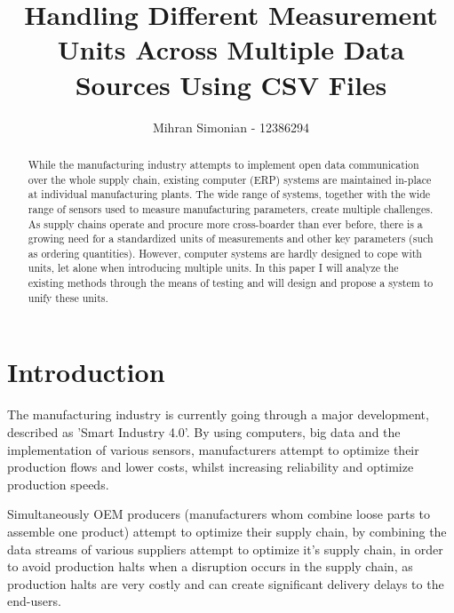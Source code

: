 \documentclass[sigchi, nonacm]{acmart}
\begin{document}
\title{Handling Different Measurement Units Across Multiple Data Sources Using CSV Files}
\author{Mihran Simonian - 12386294}

\begin{abstract}
    While the manufacturing industry attempts to implement open data communication over the whole supply chain, existing computer (ERP) systems are maintained in-place at individual manufacturing plants. The wide range of systems, together with the wide range of sensors used to measure manufacturing parameters, create multiple challenges. As supply chains operate and procure more cross-boarder than ever before, there is a growing need for a standardized units of measurements and other key parameters (such as ordering quantities). However, computer systems are hardly designed to cope with units, let alone when introducing multiple units. 
    In this paper I will analyze the existing methods through the means of testing and will design and propose a system to unify these units.
\end{abstract}


\maketitle


\section{Introduction}
The manufacturing industry is currently going through a major development, described as 'Smart Industry 4.0'\cite{lee2014service}. By using computers, big data and the implementation of various sensors, manufacturers attempt to optimize their production flows and lower costs, whilst increasing reliability and optimize production speeds.

Simultaneously OEM producers (manufacturers whom combine loose parts to assemble one product) attempt to optimize their supply chain, by combining the data streams of various suppliers attempt to optimize it's supply chain, in order to avoid production halts when a disruption occurs in the supply chain, as production halts are very costly and can create significant delivery delays to the end-users. 
\end{document}
